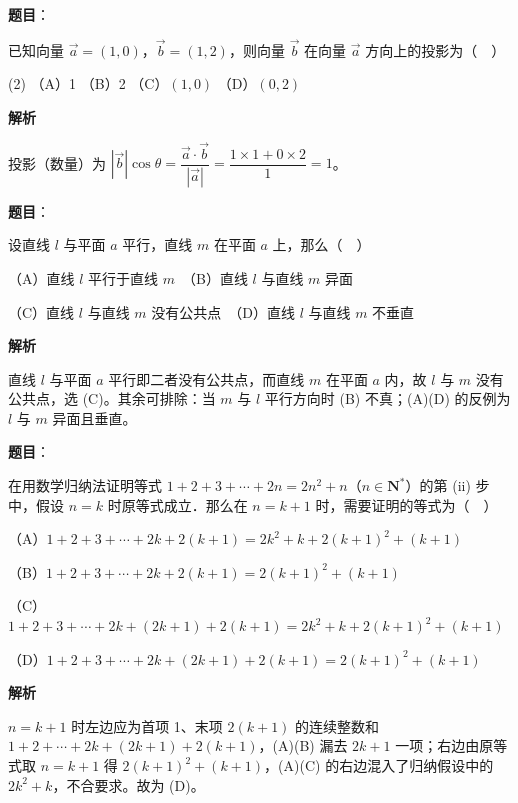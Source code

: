 \begin{answer}

\textbf{题目}：

已知向量 \(\vec{a}=(1,0)\)，\(\vec{b}=(1,2)\)，则向量 \(\vec{b}\) 在向量 \(\vec{a}\) 方向上的投影为（　）

\begin{gkopts}(2)
\task （A）1
\task （B）2
\task （C）\((1,0)\)
\task （D）\((0,2)\)
\end{gkopts}

\textbf{解析}

投影（数量）为 \(|\vec{b}|\cos\theta=\dfrac{\vec{a}\cdot\vec{b}}{|\vec{a}|}=\dfrac{1\times 1+0\times 2}{1}=1\)。


\end{answer}
\begin{answer}

\textbf{题目}：

设直线 \(l\) 与平面 \(a\) 平行，直线 \(m\) 在平面 \(a\) 上，那么（　）

（A）直线 \(l\) 平行于直线 \(m\)　（B）直线 \(l\) 与直线 \(m\) 异面

（C）直线 \(l\) 与直线 \(m\) 没有公共点　（D）直线 \(l\) 与直线 \(m\) 不垂直

\textbf{解析}

直线 \(l\) 与平面 \(a\) 平行即二者没有公共点，而直线 \(m\) 在平面 \(a\) 内，故 \(l\) 与 \(m\) 没有公共点，选 (C)。其余可排除：当 \(m\) 与 \(l\) 平行方向时 (B) 不真；(A)(D) 的反例为 \(l\) 与 \(m\) 异面且垂直。


\end{answer}
\begin{answer}

\textbf{题目}：

在用数学归纳法证明等式 \(1+2+3+\cdots+2n=2n^{2}+n\)（\(n\in\mathbf{N}^{*}\)）的第 (ii) 步中，假设 \(n=k\) 时原等式成立．那么在 \(n=k+1\) 时，需要证明的等式为（　）

（A）\(1+2+3+\cdots+2k+2(k+1)=2k^{2}+k+2(k+1)^{2}+(k+1)\)

（B）\(1+2+3+\cdots+2k+2(k+1)=2(k+1)^{2}+(k+1)\)

（C）\(1+2+3+\cdots+2k+(2k+1)+2(k+1)=2k^{2}+k+2(k+1)^{2}+(k+1)\)

（D）\(1+2+3+\cdots+2k+(2k+1)+2(k+1)=2(k+1)^{2}+(k+1)\)

\textbf{解析}

\(n=k+1\) 时左边应为首项 1、末项 \(2(k+1)\) 的连续整数和 \(1+2+\cdots+2k+(2k+1)+2(k+1)\)，(A)(B) 漏去 \(2k+1\) 一项；右边由原等式取 \(n=k+1\) 得 \(2(k+1)^{2}+(k+1)\)，(A)(C) 的右边混入了归纳假设中的 \(2k^{2}+k\)，不合要求。故为 (D)。


\end{answer}
